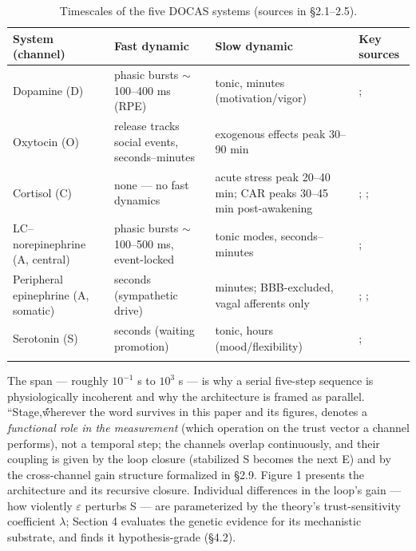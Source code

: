 \documentclass[11pt,twocolumn]{article}
\theoremstyle{plain}
\begin{document}
\begin{table}[t]
\centering\small
\caption{Timescales of the five DOCAS systems (sources in \S{}2.1--2.5).}
\label{tab:timescales}
\begin{tabular}{@{}p{}p{}p{}p{}@{}}
\toprule
System (channel) & Fast dynamic & Slow dynamic & Key sources \\
\midrule
Dopamine (D) & phasic bursts $\sim$100–400 ms (RPE) & tonic, minutes (motivation/vigor) & \citealp{schultz1998,schultz2016}; \citealp{kishida2011} \\
\addlinespace
Oxytocin (O) & release tracks social events, seconds–minutes & exogenous effects peak 30–90 min & \citealp{leng2016} \\
\addlinespace
Cortisol (C) & none — no fast dynamics & acute stress peak 20–40 min; CAR peaks 30–45 min post-awakening & \citealp{dickerson2004}; \citealp{fries2009}; \citealp{stalder2016} \\
\addlinespace
LC–norepinephrine (A, central) & phasic bursts $\sim$100–500 ms, event-locked & tonic modes, seconds–minutes & \citealp{astonjones2005}; \citealp{berridge2003} \\
\addlinespace
Peripheral epinephrine (A, somatic) & seconds (sympathetic drive) & minutes; BBB-excluded, vagal afferents only & \citealp{tank2015}; \citealp{kostrzewa2007}; \citealp{miyashita2006} \\
\addlinespace
Serotonin (S) & seconds (waiting promotion) & tonic, hours (mood/flexibility) & \citealp{miyazaki2014}; \citealp{fonseca2015} \\
\addlinespace
\bottomrule
\end{tabular}
\end{table}

The span — roughly $10^{-1}$ s to $10^{3}$ s — is why a serial five-step sequence is physiologically incoherent and why the architecture is framed as parallel. ``Stage,\'\' wherever the word survives in this paper and its figures, denotes a \textit{functional role in the measurement} (which operation on the trust vector a channel performs), not a temporal step; the channels overlap continuously, and their coupling is given by the loop closure (stabilized S becomes the next E) and by the cross-channel gain structure formalized in \S{}2.9. Figure 1 presents the architecture and its recursive closure. Individual differences in the loop's gain — how violently $\varepsilon$ perturbs S — are parameterized by the theory's trust-sensitivity coefficient $\lambda$; Section 4 evaluates the genetic evidence for its mechanistic substrate, and finds it hypothesis-grade (\S{}4.2).
\end{document}
